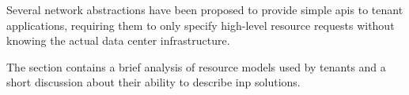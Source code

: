 Several network abstractions have been proposed to provide simple \glspl{api} to tenant applications, requiring them to only specify high-level resource requests without knowing the actual data center infrastructure.

The section contains a brief analysis of resource models used by tenants and a short discussion about their ability to describe \gls{inp} solutions.